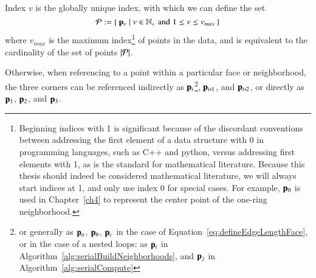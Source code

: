 Index $v$ is the globally unique index, with which we can define the set
%
\begin{equation}
	\mathcal{P} := \left \{\:\mathbf{p}_v \mid v \in \mathbb{N}, \;\text{and}\; 1\leq v \leq v_{max}\:\right \}
	\label{eq:defineSetOfPoints}
\end{equation}
%
where $v_{max}$ is the maximum index\footnote{Beginning indices with 1 is significant because of the discordant conventions between addressing the first element of a data structure with 0 in programming languages, such as C++ and python, versus addressing first elements with 1, as is the standard for mathematical literature. Because this thesis should indeed be considered mathematical literature, we will always start indices at 1, and only use index 0 for special cases. For example, $\mathbf{p}_0$ is used in Chapter~\ref{ch4} to represent the center point of the one-ring neighborhood.} of points in the data, and is equivalent to the cardinality of the set of points $|\mathcal{P}|$.%
%
%

Otherwise, when referencing to a point within a particular face or neighborhood, the three corners can be referenced indirectly as $\mathbf{p}_i$\footnote{or generally as $\mathbf{p}_a$, $\mathbf{p}_b$, $\mathbf{p}_c$ in the case of Equation~\ref{eq:defineEdgeLengthFace}, or in the case of a nested loops: as $\mathbf{p}_i$ in Algorithm~\ref{alg:serialBuildNeighborhoods}, and $\mathbf{p}_j$ in Algorithm~\ref{alg:serialCompute}}, $\bp_{\sipo}$, and $\bp_{\sipt}$, or directly as $\mathbf{p}_1$, $\mathbf{p}_2$, and $\mathbf{p}_3$.~\cite[p.~25]{Mara12}%
%
%

%
%
%
